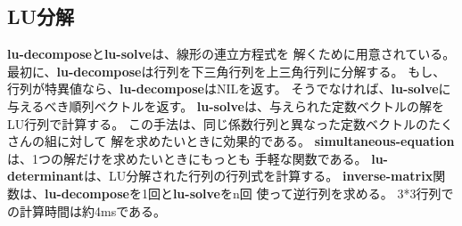 \subsection{LU分解}
{\bf lu-decompose}と{\bf lu-solve}は、線形の連立方程式を
解くために用意されている。
最初に、{\bf lu-decompose}は行列を下三角行列を上三角行列に分解する。
もし、行列が特異値なら、{\bf lu-decompose}はNILを返す。
そうでなければ、{\bf lu-solve}に与えるべき順列ベクトルを返す。
{\bf lu-solve}は、与えられた定数ベクトルの解をLU行列で計算する。
この手法は、同じ係数行列と異なった定数ベクトルのたくさんの組に対して
解を求めたいときに効果的である。
{\bf simultaneous-equation}は、1つの解だけを求めたいときにもっとも
手軽な関数である。
{\bf lu-determinant}は、LU分解された行列の行列式を計算する。
{\bf inverse-matrix}関数は、{\bf lu-decompose}を1回と{\bf lu-solve}をn回
使って逆行列を求める。
3*3行列での計算時間は約4msである。

